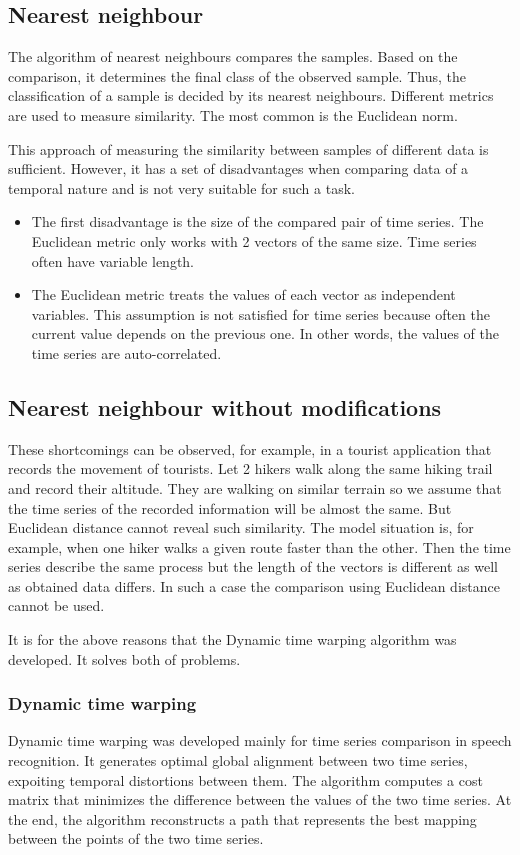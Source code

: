 \documentclass[thesis=M,english]{FITthesis}[2019/12/23]
\begin{document}
\subsection{Nearest neighbour}
The algorithm of nearest neighbours compares the samples. Based on the comparison, it determines the final class of the observed sample. Thus, the classification of a sample is decided by its nearest neighbours. Different metrics are used to measure similarity. The most common is the Euclidean norm.

This approach of measuring the similarity between samples of different data is sufficient. However, it has a set of disadvantages when comparing data of a temporal nature and is not very suitable for such a task.
\begin{itemize}
		\item The first disadvantage is the size of the compared pair of time series. The Euclidean metric only works with 2 vectors of the same size. Time series often have variable length.
		\item The Euclidean metric treats the values of each vector as independent variables. This assumption is not satisfied for time series because often the current value depends on the previous one. In other words, the values of the time series are auto-correlated.
	\end{itemize}
\subsection{Nearest neighbour without modifications}
These shortcomings can be observed, for example, in a tourist application that records the movement of tourists. Let 2 hikers walk along the same hiking trail and record their altitude. They are walking on similar terrain so we assume that the time series of the recorded information will be almost the same. But Euclidean distance cannot reveal such similarity. The model situation is, for example, when one hiker walks a given route faster than the other. Then the time series describe the same process but the length of the vectors is different as well as obtained data differs. In such a case the comparison using Euclidean distance cannot be used.

It is for the above reasons that the Dynamic time warping algorithm was developed. It solves both of problems.
\subsubsection{Dynamic time warping}
\label{label:Dynamic_time_warping}
Dynamic time warping was developed mainly for time series comparison in speech recognition. It generates optimal global alignment between two time series, expoiting temporal distortions between them. The algorithm computes a cost matrix that minimizes the difference between the values of the two time series. At the end, the algorithm reconstructs a path that represents the best mapping between the points of the two time series.
\end{document}
